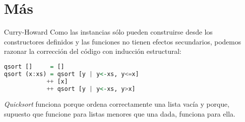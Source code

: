 \section{Más}

\begin{frame}[fragile]{Curry-Howard}
  Como las instancias sólo pueden construirse desde los constructores definidos
  y las funciones no tienen efectos secundarios, podemos razonar la
  corrección del código con inducción estructural:

  \begin{lstlisting}[language=haskell]
qsort []     = []
qsort (x:xs) = qsort [y | y<-xs, y<=x]
            ++ [x]
            ++ qsort [y | y<-xs, y>x]
  \end{lstlisting}

  \textit{Quicksort} funciona porque ordena correctamente una lista vacía y porque, supuesto
  que funcione para listas menores que una dada, funciona para ella.
\end{frame}
